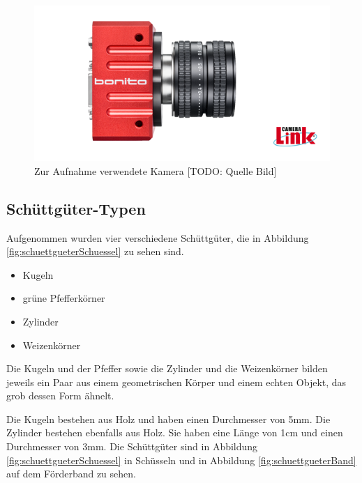 \begin{figure}
    \centering
    \includegraphics[width=\textwidth]{img/banner-Bonito_cropped}
    \caption{Zur Aufnahme verwendete Kamera [TODO: Quelle Bild]}
    \label{pictureCam}
\end{figure}

\subsection{Schüttgüter-Typen}

Aufgenommen wurden vier verschiedene Schüttgüter, die in Abbildung \ref{fig:schuettgueterSchuessel} zu sehen sind.

\begin{itemize}
    \item Kugeln
    \item grüne Pfefferkörner
    \item Zylinder
    \item Weizenkörner
\end{itemize}

Die Kugeln und der Pfeffer sowie die Zylinder und die Weizenkörner bilden jeweils 
ein Paar aus einem geometrischen Körper und einem echten Objekt, das grob dessen Form ähnelt.

Die Kugeln bestehen aus Holz und haben einen Durchmesser von 5mm.
Die Zylinder bestehen ebenfalls aus Holz. Sie haben eine Länge von 1cm und einen Durchmesser von 3mm.
Die Schüttgüter sind in Abbildung \ref{fig:schuettgueterSchuessel} in Schüsseln 
und in Abbildung \ref{fig:schuettgueterBand} auf dem Förderband zu sehen.

